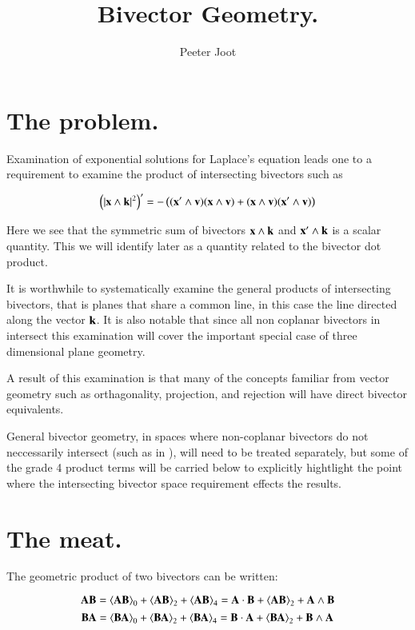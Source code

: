 \documentclass{article}      %
\title{Bivector Geometry.}
\author{Peeter Joot}         %
\newcommand{\gpgrade}[2] {{\left\langle{{#1}}\right\rangle}_{#2}}
\begin{document}

\maketitle{}

\section{ The problem. }

Examination of exponential solutions for Laplace's equation leads one to
a requirement to examine the product of intersecting bivectors such as

\[
\left(\lvert{\mathbf{x}\wedge \mathbf{k}}\rvert^2\right)' = -\left(
(\mathbf{x}' \wedge \mathbf{v})(\mathbf{x} \wedge \mathbf{v})
+(\mathbf{x} \wedge \mathbf{v})(\mathbf{x}' \wedge \mathbf{v})
\right)
\]

Here we see that the symmetric sum of bivectors $\mathbf{x} \wedge \mathbf{k}$ and $\mathbf{x}' \wedge \mathbf{k}$ is a scalar quantity.  This we will identify later as a quantity
related to the bivector dot product.

It is worthwhile to systematically examine the
general products of intersecting bivectors, that is planes that share a common line, in this case the line directed along the vector $\mathbf{k}$.
It is also notable that since all non coplanar bivectors in  intersect
this
examination will cover the important special case of three dimensional
plane geometry.

A result of this examination is that many of the concepts familiar from
vector geometry such as
orthagonality, projection, and rejection will have direct bivector
equivalents.

General bivector geometry, in spaces where non-coplanar bivectors do not 
neccessarily intersect (such as in ), will need to be treated separately,
but some of the grade 4 product terms will be carried below to explicitly
hightlight the point where the intersecting bivector space requirement
effects the results.

\section{The meat.}

The geometric product of two bivectors can be written:

\begin{equation}\label{eqn:ABprod}
\BA \BB = 
\gpgrade{\BA \BB}{0}
+\gpgrade{\BA \BB}{2}
+\gpgrade{\BA \BB}{4}
= 
{\BA \cdot \BB}
+\gpgrade{\BA \BB}{2}
+{\BA \wedge \BB}
\end{equation}
\begin{equation}\label{eqn:BAprod}
\BB \BA = 
\gpgrade{\BB \BA}{0}
+\gpgrade{\BB \BA}{2}
+\gpgrade{\BB \BA}{4}
= 
{\BB \cdot \BA}
+\gpgrade{\BB \BA}{2}
+{\BB \wedge \BA}
\end{equation}
\end{document}
